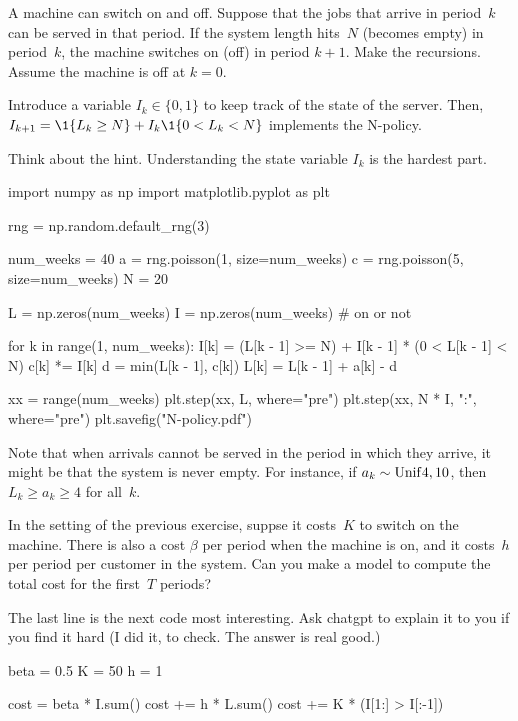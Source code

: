 \documentclass[queueing-book.tex]{subfiles}
\begin{document}
\begin{exercise}\label{ex:n-policies}
A machine  can switch on and off. Suppose that the jobs that arrive in period~$k$ can be served in that period.
 If the system length hits~$N$ (becomes empty) in period~$k$, the machine switches on (off) in period $k+1$.
Make the recursions.
Assume the machine is  off at $k=0$.
\begin{hint}
  Introduce a variable $I_k\in\{0, 1\}$ to keep track of the state of the server.
  Then, $I_{k+1} = \1{\L_k\geq N} + I_k \1{0<\L_k<N}$ implements the N-policy.
\end{hint}
\begin{solution}
Think about the hint. Understanding the state variable $I_{k}$ is the hardest part.
\begin{python}
import numpy as np
import matplotlib.pyplot as plt


rng = np.random.default_rng(3)

num_weeks = 40
a = rng.poisson(1, size=num_weeks)
c = rng.poisson(5, size=num_weeks)
N = 20

L = np.zeros(num_weeks)
I = np.zeros(num_weeks)  # on or not

for k in range(1, num_weeks):
    I[k] = (L[k - 1] >= N) + I[k - 1] * (0 < L[k - 1] < N)
    c[k] *= I[k]
    d = min(L[k - 1], c[k])
    L[k] = L[k - 1] + a[k] - d


xx = range(num_weeks)
plt.step(xx, L, where="pre")
plt.step(xx, N * I, ":", where="pre")
plt.savefig("N-policy.pdf")
\end{python}
Note that when arrivals cannot be served in the period in which they arrive, it might be that the system is never empty.
For instance, if $a_{k}\sim\mathrm{Unif}4, 10$, then $L_{k}\geq a_{k} \geq 4$ for all~$k$.
\end{solution}
\end{exercise}

\begin{exercise}
In the setting of the previous exercise, suppse  it costs~$K$ to switch on the machine.
 There is also a cost $\beta$ per period when the machine is on, and it costs~$h$ per period per customer in the system.
Can you make a  model to compute the total cost for the first~$T$ periods?
\begin{solution}
The last line is the next code most interesting.
Ask chatgpt to explain it to you if you find it hard (I did it, to check.
The answer is real good.)
\begin{python}
beta = 0.5
K = 50
h = 1


cost = beta * I.sum()
cost += h * L.sum()
cost += K * (I[1:] > I[:-1])
\end{python}
\end{solution}
\end{exercise}
\end{document}
